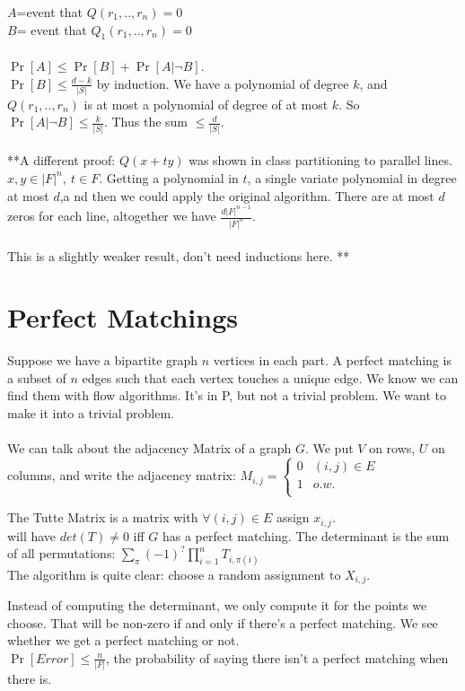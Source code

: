 \documentclass{article}
\begin{document}
$A$=event that $Q(r_1,..,r_n)=0$\\
$B$= event that $Q_1(r_1,..,r_n)=0$\\ \\
$\Pr[A]\le\Pr[B]+\Pr[A|\neg B]$. \\
$\Pr[B]\le \frac{d-k}{|S|}$ by induction. We have a polynomial of
degree $k$, and $Q(r_1,..,r_n)$ is at most a polynomial of degree of
at most $k$.  So $\Pr[A|\neg B]\le \frac{k}{|S|}$.  Thus the sum $\le
\frac{d}{|S|}$.
\\\\
**A different proof:
$Q(x+ty)$ was shown in class partitioning to  parallel lines. $x,y\in |F|^n,\ t\in F$.  Getting a polynomial in $t$, a single variate polynomial in degree at most $d$,a nd then we could apply the original algorithm. There are at most $d$ zeros for each line, altogether we have $\frac{d |F|^{n-1}}{|F|^n}$.\\\\
This is a slightly weaker result, don't need inductions here.  **

\section{Perfect Matchings}
Suppose we have a bipartite graph $n$ vertices in each part. A perfect matching is a subset of $n$ edges such that each vertex touches a unique edge.
We know we can find them with flow algorithms. It's in P, but not a trivial problem. We want to make it into a trivial problem. \\\\
We can talk about the adjacency Matrix of a graph $G$. We put $V$ on rows, $U$ on columns, and write the adjacency matrix:  $M_{i,j}=\begin{cases}0 & (i,j)\in E \\
1 & o.w. \\
\end{cases}$

The Tutte Matrix is a matrix with $\forall (i,j)\in E$ assign $x_{i,j}$.\\
will have $det(T)\ne0$ iff $G$ has a perfect matching. 
The determinant is the sum of all permutations:
$\sum_{\pi}(-1)^{?}\prod_{i=1}^{n}T_{i,\pi(i)}$\\
The algorithm is quite clear: choose a random assignment to $X_{i,j}$. 

Instead of computing the determinant, we only compute it for the points we choose. That will be non-zero if and only if there's a perfect matching. We see whether we get a perfect matching or not. \\
$\Pr[Error]\le\frac{n}{|F|}$, the probability of saying there isn't a perfect matching when there is.
\end{document}

